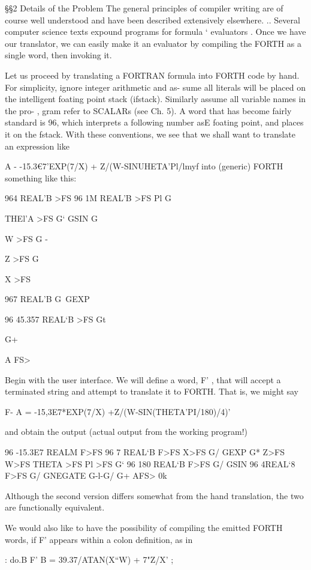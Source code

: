 §§2 Details of the Problem
The general principles of compiler writing are of course well
understood and have been described extensively elsewhere. ..
Several computer science texts expound programs for formula ‘
evaluators . Once we have our translator, we can easily make it
an evaluator by compiling the FORTH as a single word, then
invoking it.

 

Let us proceed by translating a FORTRAN formula into FORTH
code by hand. For simplicity, ignore integer arithmetic and as-
sume all literals will be placed on the intelligent foating point
stack (ifstack). Similarly assume all variable names in the pro- ,
gram refer to SCALARs (see Ch. 5). A word that has become
fairly standard is 96, which interprets a following number asE
foating point, and places it on the fstack. With these conventions,
we see that we shall want to translate an expression like

A - -15.3€7'EXP(7/X) + Z/(W-SINUHETA'Pl/lmyf
into (generic) FORTH something like this:

964 REAL’B >FS
96 1M REAL'B >FS
Pl G\

THEl’A >FS G‘
GSIN G

W >FS G -

Z >FS G\

X >FS

967 REAL'B G\
GEXP

96 45.357 REAL‘B >FS
Gt

G+

A FS>

Begin with the user interface. We will define a word, F' , that
will accept a terminated string and attempt to translate it to
FORTH. That is, we might say

F- A = -15,3E7*EXP(7/X) +Z/(W-SIN(THETA'PI/180)/4)'

and obtain the output (actual output from the working program!)

96 -15.3E7 REALM F>FS 96 7 REAL‘B F>FS
X>FS G/ GEXP G* Z>FS W>FS
THETA >FS Pl >FS G‘ 96 180 REAL‘B F>FS
G/ GSIN 96 4REAL‘8 F>FS G/ GNEGATE
G-l-G/ G+ AFS> 0k

Although the second version differs somewhat from the hand
translation, the two are functionally equivalent.

We would also like to have the possibility of compiling the emitted
FORTH words, if F' appears within a colon definition, as in

: do.B F' B = 39.37/ATAN(X“W) + 7"Z/X' ;

